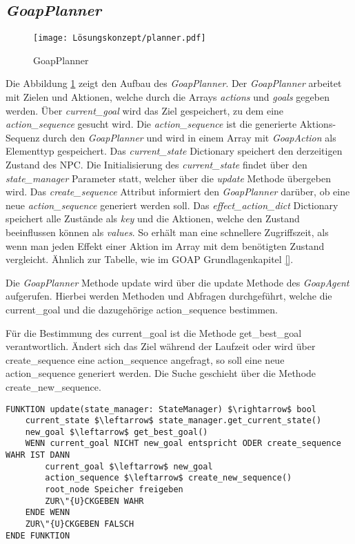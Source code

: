 \subsection{\textit{GoapPlanner}}
\label{chap:goapplanner uml}


\begin{figure}[h]
  \centering
  \texttt{[image: Lösungskonzept/planner.pdf]}
	\captionsetup{justification=justified, format=plain}
  \caption{GoapPlanner}
  \label{fig:goapplanner uml}
\end{figure}

Die Abbildung \ref{fig:goapplanner uml} zeigt den Aufbau des \textit{GoapPlanner}. Der \textit{GoapPlanner} arbeitet mit Zielen und Aktionen, welche durch die Arrays \textit{actions} und \textit{goals} gegeben werden. \"{U}ber \textit{current\_goal} wird das Ziel gespeichert, zu dem eine \textit{action\_sequence} gesucht wird. Die \textit{action\_sequence} ist die generierte Aktions-Sequenz durch den \textit{GoapPlanner} und wird in einem Array mit \textit{GoapAction} als Elementtyp gespeichert. Das \textit{current\_state} Dictionary speichert den derzeitigen Zustand des NPC. Die Initialisierung des \textit{current\_state} findet über den \textit{state\_manager} Parameter statt, welcher über die \textit{update} Methode übergeben wird. Das \textit{create\_sequence} Attribut informiert den \textit{GoapPlanner} darüber, ob eine neue \textit{action\_sequence} generiert werden soll. Das \textit{effect\_action\_dict} Dictionary speichert alle Zustände als \textit{key} und die Aktionen, welche den Zustand beeinflussen können als \textit{values}. So erhält man eine schnellere Zugriffszeit, als wenn man jeden Effekt einer Aktion im Array mit dem benötigten Zustand vergleicht. \"{A}hnlich zur Tabelle, wie im GOAP Grundlagenkapitel \ref{}.

Die \textit{GoapPlanner} Methode update wird über die update Methode des \textit{GoapAgent} aufgerufen. Hierbei werden Methoden und Abfragen durchgeführt, welche die current\_goal und die dazugehörige action\_sequence bestimmen. 

Für die Bestimmung des current\_goal ist die Methode get\_best\_goal verantwortlich. \"{A}ndert sich das Ziel während der Laufzeit oder wird über create\_sequence eine action\_sequence angefragt, so soll eine neue action\_sequence generiert werden. Die Suche geschieht über die Methode create\_new\_sequence. 

\begin{lstlisting}[language=Pseudo, caption={update Methode des \textit{GoapAgent}}, mathescape=true]
FUNKTION update(state_manager: StateManager) $\rightarrow$ bool
    current_state $\leftarrow$ state_manager.get_current_state()
    new_goal $\leftarrow$ get_best_goal()
    WENN current_goal NICHT new_goal entspricht ODER create_sequence WAHR IST DANN
        current_goal $\leftarrow$ new_goal
        action_sequence $\leftarrow$ create_new_sequence()
        root_node Speicher freigeben
        ZUR\"{U}CKGEBEN WAHR
    ENDE WENN
    ZUR\"{U}CKGEBEN FALSCH
ENDE FUNKTION
\end{lstlisting}

